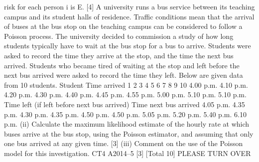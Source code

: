 \documentclass[a4paper,12pt]{article}
\begin{document}
\begin{enumerate}
risk for each person i is E.
[4]
A university runs a bus service between its teaching campus and its student halls of
residence. Traffic conditions mean that the arrival of buses at the bus stop on the
teaching campus can be considered to follow a Poisson process.
The university decided to commission a study of how long students typically have to
wait at the bus stop for a bus to arrive. Students were asked to record the time they
arrive at the stop, and the time the next bus arrived. Students who became tired of
waiting at the stop and left before the next bus arrived were asked to record the time
they left. Below are given data from 10 students.
Student Time arrived
1
2
3
4
5
6
7
8
9
10 4.00 p.m.
4.10 p.m.
4.20 p.m.
4.30 p.m.
4.40 p.m.
4.45 p.m.
4.55 p.m.
5.00 p.m.
5.10 p.m.
5.10 p.m.
Time left (if
left before
next bus
arrived)
Time next
bus arrived
4.05 p.m.
4.35 p.m.
4.30 p.m.
4.35 p.m.
4.50 p.m.
4.50 p.m.
5.05 p.m.
5.20 p.m.
5.40 p.m.
6.10 p.m.
(ii) Calculate the maximum likelihood estimate of the hourly rate at which buses
arrive at the bus stop, using the Poisson estimator, and assuming that only one
bus arrived at any given time.
[3]
(iii) Comment on the use of the Poisson model for this investigation.
CT4 A2014–5
[3]
[Total 10]
PLEASE TURN OVER

\newpage


\end{enumerate}
\end{document}
